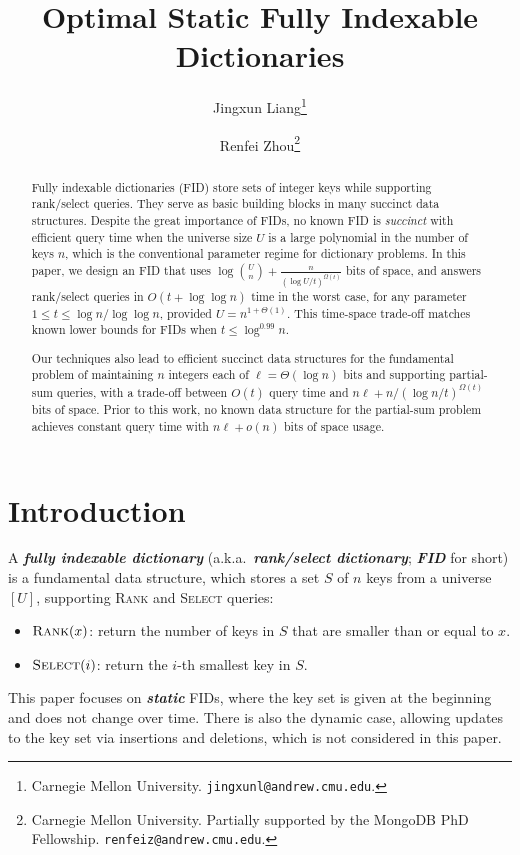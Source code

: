 \documentclass{article}
\title{Optimal Static Fully Indexable Dictionaries}
\author{
Jingxun Liang\thanks{Carnegie Mellon University. \texttt{jingxunl@andrew.cmu.edu}.}
\and
Renfei Zhou\thanks{Carnegie Mellon University. Partially supported by the MongoDB PhD Fellowship. \texttt{renfeiz@andrew.cmu.edu}.}
}
\date{}
\theoremstyle{plain}
\theoremstyle{definition}  \newtheorem{definition}[theorem]{Definition}
\renewcommand{\l}{\ell}
\newcommand{\rank}{\textup{\textsc{Rank}}\xspace}
\newcommand{\select}{\textup{\textsc{Select}}\xspace}
\newcommand{\defn}[1]{\emph{\textbf{#1}}}
\begin{document}
\maketitle

\begin{abstract}
  Fully indexable dictionaries (FID) store sets of integer keys while supporting rank/select queries. They serve as basic building blocks in many succinct data structures. Despite the great importance of FIDs, no known FID is \emph{succinct} with efficient query time when the universe size $U$ is a large polynomial in the number of keys $n$, which is the conventional parameter regime for dictionary problems. In this paper, we design an FID that uses $\log \binom{U}{n} + \frac{n}{(\log U / t)^{\Omega(t)}}$ bits of space, and answers rank/select queries in $O(t + \log \log n)$ time in the worst case, for any parameter $1 \le t \le \log n / \log \log n$, provided $U = n^{1 + \Theta(1)}$. This time-space trade-off matches known lower bounds for FIDs \cite{patrascu2006timespace, patrascu2010cellprobe, viola2023new} when $t \le \log^{0.99} n$.
  
  Our techniques also lead to efficient succinct data structures for the fundamental problem of maintaining $n$ integers each of $\l = \Theta(\log n)$ bits and supporting partial-sum queries, with a trade-off between $O(t)$ query time and $n\l + n / (\log n / t)^{\Omega(t)}$ bits of space. Prior to this work, no known data structure for the partial-sum problem achieves constant query time with $n \l + o(n)$ bits of space usage.
\end{abstract}


\section{Introduction}
\label{sec:introduction}
A \defn{fully indexable dictionary} (a.k.a.~\defn{rank/select dictionary}; \defn{FID} for short) is a fundamental data structure, which stores a set $S$ of $n$ keys from a universe $[U]$, supporting \rank and \select queries:
\begin{itemize}
\item $\rank(x)$: return the number of keys in $S$ that are smaller than or equal to $x$.
\item $\select(i)$: return the $i$-th smallest key in $S$.
\end{itemize}
This paper focuses on \defn{static} FIDs, where the key set is given at the beginning and does not change over time. There is also the dynamic case, allowing updates to the key set via insertions and deletions, which is not considered in this paper.
\end{document}
